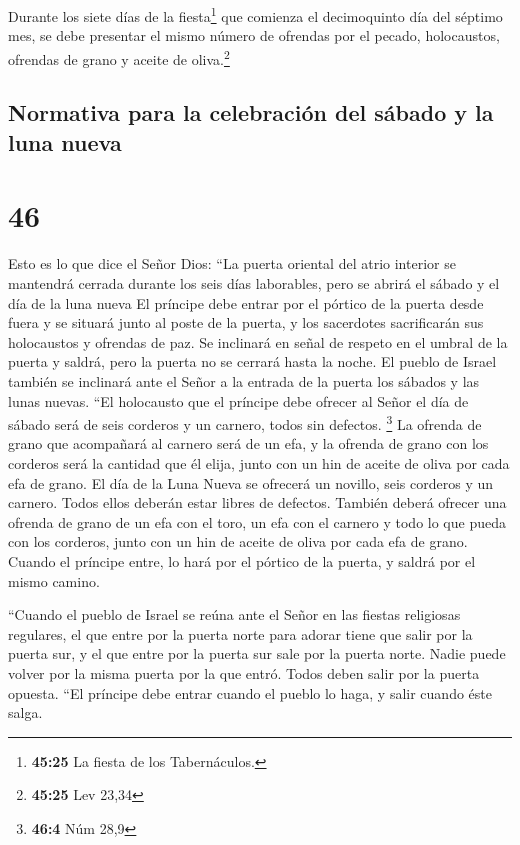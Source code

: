  Durante los siete días de la fiesta\footnote{\textbf{45:25}
  La fiesta de los Tabernáculos.} que comienza el decimoquinto día del
séptimo mes, se debe presentar el mismo número de ofrendas por el
pecado, holocaustos, ofrendas de grano y aceite de oliva.\footnote{\textbf{45:25}
  Lev 23,34}

\hypertarget{normativa-para-la-celebraciuxf3n-del-suxe1bado-y-la-luna-nueva}{%
\subsection{Normativa para la celebración del sábado y la luna
nueva}\label{normativa-para-la-celebraciuxf3n-del-suxe1bado-y-la-luna-nueva}}

\hypertarget{section-45}{%
\section{46}\label{section-45}}

 Esto es lo que dice el Señor Dios: ``La puerta oriental
del atrio interior se mantendrá cerrada durante los seis días
laborables, pero se abrirá el sábado y el día de la luna nueva
 El príncipe debe entrar por el pórtico de la puerta desde
fuera y se situará junto al poste de la puerta, y los sacerdotes
sacrificarán sus holocaustos y ofrendas de paz. Se inclinará en señal de
respeto en el umbral de la puerta y saldrá, pero la puerta no se cerrará
hasta la noche.  El pueblo de Israel también se inclinará
ante el Señor a la entrada de la puerta los sábados y las lunas nuevas.
 ``El holocausto que el príncipe debe ofrecer al Señor el
día de sábado será de seis corderos y un carnero, todos sin defectos.
\footnote{\textbf{46:4} Núm 28,9}  La ofrenda de grano que
acompañará al carnero será de un efa, y la ofrenda de grano con los
corderos será la cantidad que él elija, junto con un hin de aceite de
oliva por cada efa de grano.  El día de la Luna Nueva se
ofrecerá un novillo, seis corderos y un carnero. Todos ellos deberán
estar libres de defectos.  También deberá ofrecer una
ofrenda de grano de un efa con el toro, un efa con el carnero y todo lo
que pueda con los corderos, junto con un hin de aceite de oliva por cada
efa de grano.  Cuando el príncipe entre, lo hará por el
pórtico de la puerta, y saldrá por el mismo camino.

 ``Cuando el pueblo de Israel se reúna ante el Señor en
las fiestas religiosas regulares, el que entre por la puerta norte para
adorar tiene que salir por la puerta sur, y el que entre por la puerta
sur sale por la puerta norte. Nadie puede volver por la misma puerta por
la que entró. Todos deben salir por la puerta opuesta. 
``El príncipe debe entrar cuando el pueblo lo haga, y salir cuando éste
salga.

